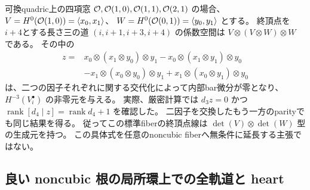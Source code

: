 \begin{remark}[可換基準例の終頂点サイクル]
\label{rem:five-window-commutative-tor-cycle}
可換quadric上の四項窓
$\mathcal O,\mathcal O(1,0),\mathcal O(1,1),\mathcal O(2,1)$ の場合、
$V=H^0(\mathcal O(1,0))=\langle x_0,x_1\rangle$、
$W=H^0(\mathcal O(0,1))=\langle y_0,y_1\rangle$ とする。
終頂点を$i+4$とする長さ三の道
$(i,i+1,i+3,i+4)$ の係数空間は
$V\otimes(V\otimes W)\otimes W$ である。
その中の
\[
\begin{aligned}
z={}&x_0\otimes(x_1\otimes y_0)\otimes y_1
 -x_0\otimes(x_1\otimes y_1)\otimes y_0\\
 &-x_1\otimes(x_0\otimes y_0)\otimes y_1
 +x_1\otimes(x_0\otimes y_1)\otimes y_0
\end{aligned}
\]
は、二つの因子それぞれに関する交代化によって内部bar微分が零となり、
$H^{-3}(V_i^\bullet)$ の非零元を与える。
実際、厳密計算では
$d_3z=0$ かつ $\operatorname{rank}[d_4\mid z]
=\operatorname{rank}d_4+1$ を確認した。
二因子を交換したもう一方のparityでも同じ結果を得る。
従ってこの標準fiberの終頂点線は
$\det(V)\otimes\det(W)$ 型の生成元を持つ。
この具体式を任意のnoncubic fiberへ無条件に延長する主張ではない。
\end{remark}

\subsection{良い noncubic 根の局所環上での全軌道と heart}


